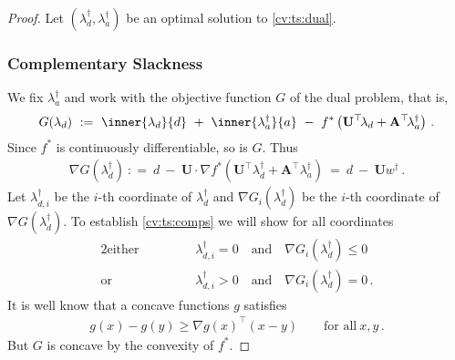 \begin{proof}
  Let 
$
(\lambda_d^\dagger,\lambda_a^\dagger)
$
be an optimal solution to \eqref{cv:ts:dual}. 

\subsubsection*{Complementary Slackness}
  We fix 
  $
  \lambda_a^\dagger
  $
  and
  work with the objective function $G$ of the dual problem, that is,
  \begin{gather*}
    G
(\lambda_d)
\
:
=
\
    \inner
    {\lambda_d}
    {d}
    \ 
    +
    \ 
    \inner
    {\lambda_a^\dagger}
    {a}
    \ 
    -
    \ 
    f^*
    \left( 
      \mathbf{U}^\top \!\lambda_d
      +
      \mathbf{A}^\top \! \lambda_a^\dagger
    \right)
    \,.
  \end{gather*}
  Since $f^*$ is continuously differentiable, so is $G$.
  Thus
  \begin{gather*}
    \nabla
    G
(\lambda_d^\dagger)
\
:
=
\
d
\ 
    -
    \ 
    \mathbf{U}
    \cdot
    \nabla
    f^*
    \!
    \left( 
      \mathbf{U}^\top \lambda_d^\dagger
      +
      \mathbf{A}^\top  \lambda_a^\dagger
    \right)
    \ 
    =
    \ 
d
\ 
    -
    \ 
    \mathbf{U}
    w^\dagger
    \,.
  \end{gather*}
Let
$\lambda_{d,i}^\dagger$ be the $i$-th coordinate of $\lambda_d^\dagger$ 
and
$
\nabla
G_i
(\lambda_d^\dagger)
$
be the $i$-th coordinate of 
$
\nabla
G
(\lambda_d^\dagger)
$.
  To establish \eqref{cv:ts:comps} we will show
  for all coordinates 
\begin{alignat*}{2}
  \text{either}
  &
  &&
  \qquad
  \lambda_{d,i}^\dagger
  = 0
  \quad
  \text{and}
  \quad
  \nabla
  G
  _i(
  \lambda_{d}^\dagger
  ) \le 0
  \\
  \text{or}
  &
  &&
  \qquad
  \lambda_{d,i}^\dagger
  > 0
  \quad
  \text{and}
  \quad
  \nabla
  G
  _i(
  \lambda_{d}^\dagger
  ) = 0
  \,.
\end{alignat*}
It is well know that a concave functions $g$ satisfies
  \begin{gather}
    \label{cv:ts:concD}
    g(x)-g(y)
    \ge
    \nabla
    g(x)^\top
    (x-y)
    \qquad 
    \text{for all}\ 
    x,y\,.
  \end{gather}
  But $G$ is concave 
  by the convexity of $f^*$.


\end{proof}
